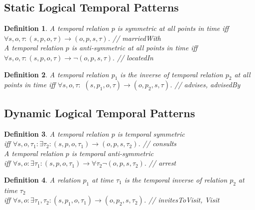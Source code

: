 \documentclass[letterpaper]{article} %
\newtheorem{definition}{Definition}
\begin{document}
\subsection{\textbf{Static Logical Temporal Patterns}} 
\begin{definition}
\label{temporalsym}
A temporal relation $p$ is symmetric at all points in time iff $\forall s,o,\tau:(s,p,o,\tau) \rightarrow (o,p,s,\tau)$. \hfill // marriedWith \\ 
A temporal relation $p$ is anti-symmetric at all points in time iff
$\forall s,o,\tau:(s,p,o,\tau) \rightarrow \neg (o,p,s,\tau). $ \hfill // locatedIn 
\end{definition}
\begin{definition}
A temporal relation $p_1$ is the inverse of temporal relation $p_2$ at all points in time 
iff $\forall s,o,\tau:$
$(s,p_1,o,\tau) \rightarrow (o,p_2,s,\tau)$. \hfill // advises, advisedBy
\label{temporalinv}
\end{definition}

\subsection{\textbf{Dynamic Logical Temporal Patterns}}
\begin{definition}
\label{dynamicsym} 
A temporal relation $p$ is temporal symmetric \\ iff $\forall s,o, \tau_1: \exists\tau_2:(s,p,o,\tau_{1}) \rightarrow (o,p,s,\tau_{2})$. \hfill // consults \\ 
A temporal relation $p$ is temporal anti-symmetric\\ iff
$\forall s,o: \exists\tau_1:(s,p,o,\tau_{1}) \rightarrow \forall \tau_2 \neg (o,p,s,\tau_{2}). $ \hfill // arrest 
\end{definition}

\begin{definition}
A relation $p_1$ at time $\tau_1$ is the temporal inverse of relation $p_2$ at time $\tau_2$ \\ iff $\forall s,o: \exists\tau_1,\tau_2: (s,p_1,o,\tau_1) \rightarrow (o,p_2,s,\tau_2)$. \hfill // invitesToVisit, Visit
\label{delayedtemporalinv}
\end{definition}

\end{document}
